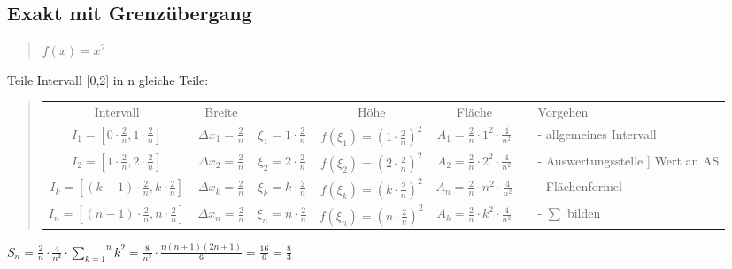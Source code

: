 \subsection*{Exakt mit Grenzübergang}
\begin{verse}
$f(x)=x^{2}$
\end{verse}
Teile Intervall {[}0,2{]} in n gleiche Teile:
\begin{verse}
\begin{tabular}{|c|c|c|c|c|cl}
\cline{1-5} 
Intervall & Breite &  & Höhe & Fläche &  & Vorgehen\tabularnewline
\cline{1-5} \cline{7-7} 
$I_{1}=[0\cdot\frac{2}{n},1\cdot\frac{2}{n}]$ & $\Delta x_{1}=\frac{2}{n}$ & $\xi_{1}=1\cdot\frac{2}{n}$ & $f(\xi_{1})=(1\cdot\frac{2}{n})^{2}$ & $A_{1}=\frac{2}{n}\cdot1^{2}\cdot\frac{4}{n^{2}}$ &  & - allgemeines Intervall\tabularnewline
\cline{1-5} 
$I_{2}=[1\cdot\frac{2}{n},2\cdot\frac{2}{n}]$ & $\Delta x_{2}=\frac{2}{n}$ & $\xi_{2}=2\cdot\frac{2}{n}$ & $f(\xi_{2})=(2\cdot\frac{2}{n})^{2}$ & $A_{2}=\frac{2}{n}\cdot2^{2}\cdot\frac{4}{n^{2}}$ &  & - Auswertungsstelle {]} Wert an AS\tabularnewline
\cline{1-5} 
$I_{k}=[(k-1)\cdot\frac{2}{n},k\cdot\frac{2}{n}]$ & $\Delta x_{k}=\frac{2}{n}$ & $\xi_{k}=k\cdot\frac{2}{n}$ & $f(\xi_{k})=(k\cdot\frac{2}{n})^{2}$ & $A_{n}=\frac{2}{n}\cdot n^{2}\cdot\frac{4}{n^{2}}$ &  & - Flächenformel\tabularnewline
\cline{1-5} 
$I_{n}=[(n-1)\cdot\frac{2}{n},n\cdot\frac{2}{n}]$ & $\Delta x_{n}=\frac{2}{n}$ & $\xi_{n}=n\cdot\frac{2}{n}$ & $f(\xi_{n})=(n\cdot\frac{2}{n})^{2}$ & $A_{k}=\frac{2}{n}\cdot k^{2}\cdot\frac{4}{n^{2}}$ &  & - $\sum$ bilden\tabularnewline
\cline{1-5} 
\end{tabular}
\end{verse}
$S_{n}=\frac{2}{n}\cdot\frac{4}{n^{2}}\cdot\overset{n}{\underset{k=1}{\sum}}k^{2}=\frac{8}{n^{3}}\cdot\frac{n(n+1)(2n+1)}{6}=\frac{16}{6}=\frac{8}{3}$

